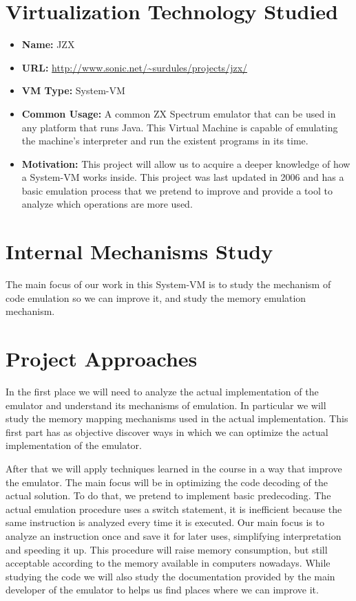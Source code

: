 \documentclass[times, 10pt,twocolumn]{scrartcl}
\begin{document}
\section{Virtualization Technology Studied}
\begin{itemize}
\item\textbf{Name:} JZX\\
\item\textbf{URL:} \url{http://www.sonic.net/~surdules/projects/jzx/}\\
\item\textbf{VM Type:} System-VM\\
\item\textbf{Common Usage:} A common ZX Spectrum emulator that can be used in any platform that runs Java. This Virtual Machine is capable of emulating the machine's interpreter and run the existent programs in its time.\\
\item\textbf{Motivation:} This project will allow us to acquire a deeper knowledge of how a System-VM works inside. This project was last updated in 2006 and has a basic emulation process that we pretend to improve and provide a tool to analyze which operations are more used.\\
\end{itemize}

\section{Internal Mechanisms Study}
  The main focus of our work in this System-VM is to study the mechanism of code emulation so we can improve it, and study the memory emulation mechanism.

\section{Project Approaches}
In the first place we will need to analyze the actual implementation of the emulator and understand its mechanisms of emulation. In particular we will study the memory mapping mechanisms used in the actual implementation. This first part has as objective discover ways in which we can optimize the actual implementation of the emulator.

After that we will apply techniques learned in the course in a way that improve the emulator. The main focus will be in optimizing the code decoding of the actual solution. To do that, we pretend to implement basic predecoding. 
The actual emulation procedure uses a switch statement, it is inefficient because the same instruction is analyzed every time it is executed. Our main focus is to analyze an instruction once and save it for later uses, simplifying interpretation and speeding it up. This procedure will raise memory consumption, but still acceptable according to the memory available in computers nowadays.
While studying the code we will also study the documentation provided by the main developer of the emulator to helps us find places where we can improve it.
\end{document}
